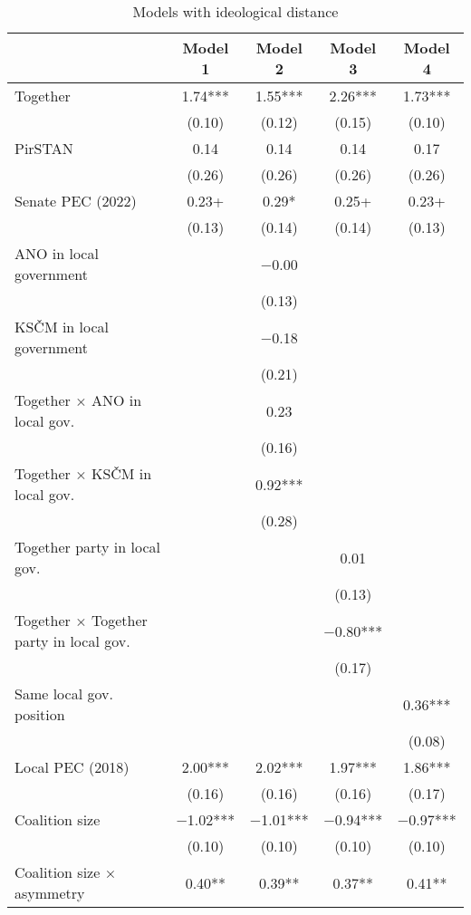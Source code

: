 \begin{table}
\centering
\caption{Models with ideological distance \label{tab:3}}
\begin{tabular}[t]{lcccc}
\toprule
  & Model 1 & Model 2 & Model 3 & Model 4\\
\midrule
Together & \num{1.74}*** & \num{1.55}*** & \num{2.26}*** & \num{1.73}***\\
 & (\num{0.10}) & (\num{0.12}) & (\num{0.15}) & (\num{0.10})\\
PirSTAN & \num{0.14} & \num{0.14} & \num{0.14} & \num{0.17}\\
 & (\num{0.26}) & (\num{0.26}) & (\num{0.26}) & (\num{0.26})\\
Senate PEC (2022) & \num{0.23}+ & \num{0.29}* & \num{0.25}+ & \num{0.23}+\\
 & (\num{0.13}) & (\num{0.14}) & (\num{0.14}) & (\num{0.13})\\
ANO in local government &  & \num{-0.00} &  & \\
 &  & (\num{0.13}) &  & \\
KSČM in local government &  & \num{-0.18} &  & \\
 &  & (\num{0.21}) &  & \\
Together × ANO in local gov. &  & \num{0.23} &  & \\
 &  & (\num{0.16}) &  & \\
Together × KSČM in local gov. &  & \num{0.92}*** &  & \\
 &  & (\num{0.28}) &  & \\
Together party in local gov. &  &  & \num{0.01} & \\
 &  &  & (\num{0.13}) & \\
Together × Together party in local gov. &  &  & \num{-0.80}*** & \\
 &  &  & (\num{0.17}) & \\
Same local gov. position &  &  &  & \num{0.36}***\\
 &  &  &  & (\num{0.08})\\
Local PEC (2018) & \num{2.00}*** & \num{2.02}*** & \num{1.97}*** & \num{1.86}***\\
 & (\num{0.16}) & (\num{0.16}) & (\num{0.16}) & (\num{0.17})\\
Coalition size & \num{-1.02}*** & \num{-1.01}*** & \num{-0.94}*** & \num{-0.97}***\\
 & (\num{0.10}) & (\num{0.10}) & (\num{0.10}) & \vphantom{1} (\num{0.10})\\
Coalition size × asymmetry & \num{0.40}** & \num{0.39}** & \num{0.37}** & \num{0.41}**\\

\end{tabular}
\end{table}
